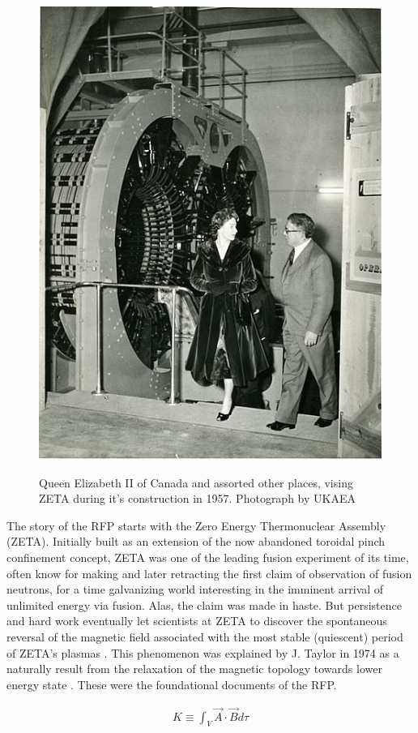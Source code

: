 \begin{refsection}
\begin{figure}[!htb]
	\centering
	\includegraphics[width = 0.75\linewidth]{./1_Introduction/queen_at_zeta.jpg}
    \label{fig:Queen_at_ZETA}
    \caption[Queen Elizabeth II at the ZETA experiment]{Queen Elizabeth II of Canada and assorted other places, vising ZETA during it's construction in 1957. Photograph by UKAEA}
\end{figure}%

The story of the RFP starts with the Zero Energy Thermonuclear Assembly (ZETA).
Initially built as an extension of the now abandoned toroidal pinch confinement
concept, ZETA was one of the leading fusion experiment of its time, often know
for making and later retracting the first claim of observation of fusion
neutrons, for a time galvanizing world interesting in the imminent arrival of
unlimited energy via fusion. Alas, the claim was made in haste. But persistence
and hard work eventually let scientists at ZETA to discover the spontaneous
reversal of the magnetic field associated with the most stable (quiescent)
period of ZETA's plasmas \cite{Butt_IAEA66,Robinson_IAEA69}. This phenomenon
was explained by J. Taylor in 1974 as a naturally result from the relaxation of
the magnetic topology towards lower energy state \cite{Taylor74}. These were
the foundational documents of the RFP.

\begin{align}\label{eqn:helicity}
	K \equiv \int_{V} \vec{A} \cdot \vec{B} d\tau
\end{align}


\end{refsection}
